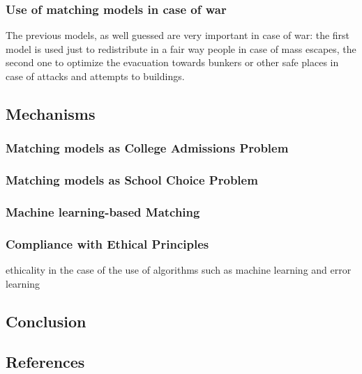 \documentclass[letterpaper]{article} %
\begin{document}
\subsubsection{Use of matching models in case of war}

The previous models, as well guessed are very important in case of war: the first model is used just 
to redistribute in a fair way people in case of mass escapes, the second one to optimize the evacuation 
towards bunkers or other safe places in case of attacks and attempts to buildings.

\cite{delacretaz} 

\subsection{Mechanisms}

\subsubsection{Matching models as College Admissions Problem}

\cite{basshuysen} 

\subsubsection{Matching models as School Choice Problem}

\cite{basshuysen} 

\subsubsection{Machine learning-based Matching}

\cite{olbergml}

\subsubsection{Compliance with Ethical Principles}

\cite{basshuysen} 

ethicality in the case of the use of algorithms such as machine learning and error learning 

\subsection{Conclusion}

\subsection{References}



\end{document}
